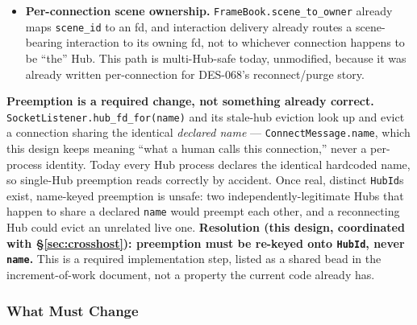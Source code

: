 \documentclass[a4paper,10pt]{article}
\newcommand{\field}[1]{\texttt{#1}}
\begin{document}
\begin{itemize}
  \item \textbf{Per-connection scene ownership.}
    \texttt{FrameBook.scene\_to\_owner} already maps \field{scene\_id} to
    an fd, and interaction delivery already routes a scene-bearing
    interaction to its owning fd, not to whichever connection happens to
    be ``the'' Hub.  This path is multi-Hub-safe today, unmodified,
    because it was already written per-connection for DES-068's
    reconnect/purge story.
\end{itemize}

\textbf{Preemption is a required change, not something already correct.}
\texttt{SocketListener.hub\_fd\_for(name)} and its stale-hub eviction look
up and evict a connection sharing the identical \emph{declared name} ---
\field{ConnectMessage.name}, which this design keeps meaning ``what a
human calls this connection,'' never a per-process identity.  Today every
Hub process declares the identical hardcoded name, so single-Hub
preemption reads correctly by accident.  Once real, distinct
\texttt{HubId}s exist, name-keyed preemption is unsafe: two
independently-legitimate Hubs that happen to share a declared
\field{name} would preempt each other, and a reconnecting Hub could evict
an unrelated live one.  \textbf{Resolution (this design, coordinated with
\S\ref{sec:crosshost}): preemption must be re-keyed onto \texttt{HubId},
never \field{name}.}  This is a required implementation step, listed as a
shared bead in the increment-of-work document, not a property the current
code already has.

\subsubsection{What Must Change}
\end{document}
